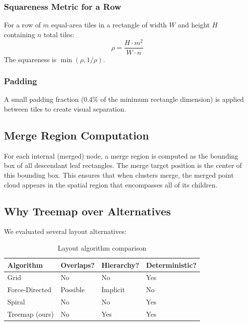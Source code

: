 \documentclass[11pt, letterpaper]{article}
\begin{document}
\subsubsection{Squareness Metric for a Row}

For a row of $m$ equal-area tiles in a rectangle of width $W$ and height $H$ containing $n$ total tiles:
\begin{equation}
    \rho = \frac{H \cdot m^2}{W \cdot n}
\end{equation}
The squareness is $\min(\rho, 1/\rho)$.

\subsubsection{Padding}

A small padding fraction (0.4\% of the minimum rectangle dimension) is applied between tiles to create visual separation.

\subsection{Merge Region Computation}

For each internal (merged) node, a merge region is computed as the bounding box of all descendant leaf rectangles. The merge target position is the center of this bounding box. This ensures that when clusters merge, the merged point cloud appears in the spatial region that encompasses all of its children.

\subsection{Why Treemap over Alternatives}

We evaluated several layout alternatives:

\begin{table}[H]
\centering
\caption{Layout algorithm comparison}
\begin{tabular}{@{}llll@{}}
\toprule
\textbf{Algorithm} & \textbf{Overlaps?} & \textbf{Hierarchy?} & \textbf{Deterministic?} \\
\midrule
Grid & No & No & Yes \\
Force-Directed & Possible & Implicit & No \\
Spiral & No & No & Yes \\
Treemap (ours) & No & Yes & Yes \\
\bottomrule
\end{tabular}
\end{table}
\end{document}
